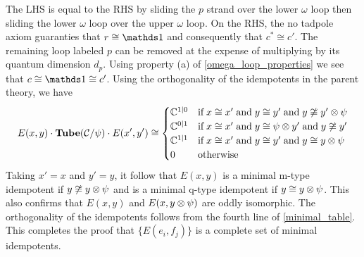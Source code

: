 The LHS is equal to the RHS by sliding the $p$ strand over the lower $\omega$ loop 
then sliding the lower $\omega$ loop over the upper $\omega$ loop.
On the RHS,
the no tadpole axiom guaranties that $r \cong \unit$ and consequently that $c^* \cong c'$.
The remaining loop labeled $p$ can be removed at the expense of multiplying by its quantum dimension $d_p$.
Using property (a) of \ref{omega_loop_properties} we see that $c \cong \unit \cong c'$.
Using the orthogonality of the idempotents in the parent theory, we have
\begin{align}
\label{minimal_table}
E(x,y) \cdot \textbf{Tube}(\mathcal{C}/\psi) \cdot E(x',y') \cong
\begin{cases}
\mathbb{C}^{1|0}& \text{if}\; x \cong x' \; \text{and}\; y \cong y' \; \text{and}\; y \not\cong y'\otimes \psi \\
\mathbb{C}^{0|1}& \text{if}\; x \cong x' \; \text{and}\; y \cong \psi \otimes y' \; \text{and}\; y \not \cong y' \\
\mathbb{C}^{1|1}& \text{if}\; x\cong x' \; \text{and}\; y \cong y'\; \text{and} \; y \cong y \otimes \psi \\
0 & \text{otherwise}
\end{cases}
\end{align}
Taking $x' = x$ and $y' = y$, it follow that $E(x,y)$ is a minimal m-type idempotent if $y\not\cong y\otimes\psi$
and is a minimal q-type idempotent if $y \cong y\otimes\psi$. 
This also confirms that $E(x,y)$ and $E(x,y \otimes \psi)$ are oddly isomorphic.
The orthogonality of the idempotents follows from the fourth line of \eqref{minimal_table}.
This completes the proof that $\{ E(e_i, f_j) \}$ is a complete set of minimal idempotents.

\medskip

